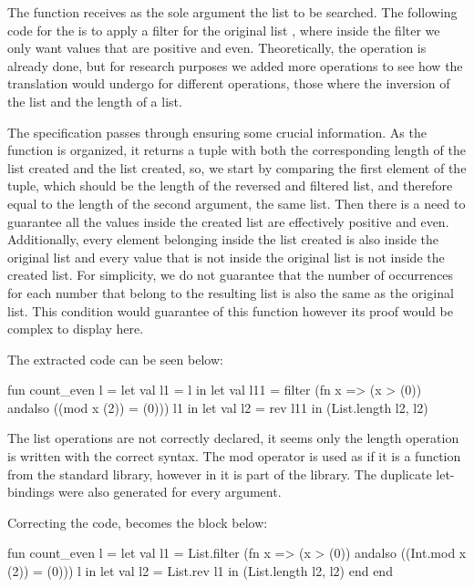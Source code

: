 The function  receives as the sole argument the list to be searched. The following code for the 
is to apply a filter for the original list , where inside the filter we only want values that are positive and even.
Theoretically, the operation is already done, but for research purposes we added more operations to see how the translation would undergo
for different operations, those where the inversion of the list and the length of a list.

The specification passes through ensuring some crucial information. As the function is organized, it returns a tuple with both the 
corresponding length of the list created and the list created, so, we start by comparing the first element of the tuple, which should 
be the length of the reversed and filtered list, and therefore equal to the length of the second argument, the same list. Then there is 
a need to guarantee all the values inside the created list are effectively positive and even. Additionally, every element belonging 
inside the list created is also inside the original list and every value that is not inside the original list is not inside the created 
list. For simplicity, we do not guarantee that the number of occurrences for each number that belong to the resulting list is also 
the same as the original list. This condition would guarantee of this function however its proof would be complex to display here.

The extracted code can be seen below:

\begin{cakeml}
fun count_even l =
  let val l1 = l in
  let val l11 = filter (fn x => (x > (0)) andalso ((mod x (2)) = (0))) l1 in
  let val l2 = rev l11 in (List.length l2, l2)
\end{cakeml}

The list operations are not correctly declared, it seems only the length operation is written with the correct syntax. The mod operator
is used as if it is a function from the standard library, however in \cml it is part of the  library. The duplicate 
let-bindings were also generated for every argument.

Correcting the code, becomes the block below:

\begin{cakeml}
fun count_even l =
  let val l1 = List.filter (fn x => (x > (0)) andalso ((Int.mod x (2)) = (0))) l in
  let val l2 = List.rev l1 in (List.length l2, l2) end end
\end{cakeml}

